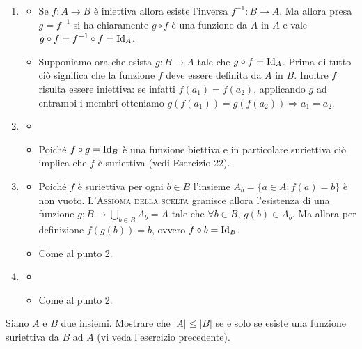 \documentclass[a4paper]{article}\par \usepackage{style}\par
\begin{document}
\begin{enumerate}
\item \begin{itemize}[label = $ \Rightarrow $]
  \item Se $ f \colon A \to B $ è iniettiva allora esiste l'inversa $ f^{-1} \colon B \to A $. Ma allora presa $ g = f^{-1} $ si ha chiaramente $ g \circ f $ è una funzione da $ A $ in $ A $ e vale $ g \circ f = f^{-1} \circ f = \mathrm{Id}_A $.
  \end{itemize}
  \begin{itemize}[label = $ \Leftarrow $]
  \item Supponiamo ora che esista $ g \colon B \to A $ tale che $ g \circ f = \mathrm{Id}_A $. Prima di tutto ciò significa che la funzione $ f $ deve essere definita da $ A $ in $ B $. Inoltre $ f $ risulta essere iniettiva: se infatti $ f(a_1) = f(a_2) $, applicando $ g $ ad entrambi i membri otteniamo $ g(f(a_1)) = g(f(a_2)) \Rightarrow a_1 = a_2 $.
  \end{itemize}
\item  \begin{itemize}[label = $ \Rightarrow $]
  \item
  \end{itemize}
  \begin{itemize}[label = $ \Leftarrow $]
  \item Poiché $ f \circ g = \mathrm{Id}_B $ è una funzione biettiva e in particolare suriettiva ciò implica che $ f $ è suriettiva (vedi Esercizio 22).
  \end{itemize}
\item \begin{itemize}[label = $ \Rightarrow $]
  \item Poiché $ f $ è suriettiva per ogni $ b \in B $ l'insieme $ A_b = \{a \in A : f(a) = b\} $ è non vuoto. L'\textsc{Assioma della scelta} granisce allora l'esistenza di una funzione $ g \colon B \to \bigcup_{b \in B} A_b = A $ tale che $ \forall b \in B $, $ g(b) \in A_b $. Ma allora per definizione $ f(g(b)) = b $, ovvero $ f \circ b = \mathrm{Id}_B $.
  \end{itemize}
  \begin{itemize}[label = $ \Leftarrow $]
  \item Come al punto 2.
  \end{itemize}
\item \begin{itemize}[label = $ \Rightarrow $]
  \item
  \end{itemize}
  \begin{itemize}[label = $ \Leftarrow $]
  \item Come al punto 2.
  \end{itemize}
\end{enumerate}\par \begin{es}
  Siano $ A $ e $ B $ due insiemi. Mostrare che $ |A| \leq |B| $ se e solo se esiste una funzione suriettiva da $ B $ ad $ A $ (vi veda l'esercizio precedente).
\end{es}
\end{document}

